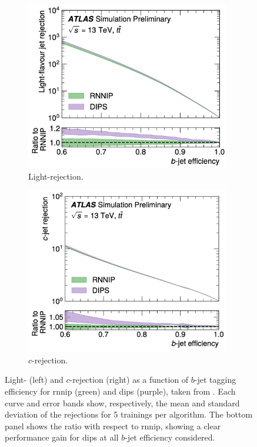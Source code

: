 \begin{figure}[h!]
  \centering
  \begin{subfigure}[b]{0.48\textwidth}
      \centering
      \includegraphics[width=0.98\textwidth]{Images/FTAG/dipsrnnipL.png}
      \caption{Light-rejection.} 
      \label{fig:dipsrnnipPerfL}
  \end{subfigure}
  \hfill
  \begin{subfigure}[b]{0.48\textwidth}
      \centering
      \includegraphics[width=0.98\textwidth]{Images/FTAG/dipsrnnipC.png}
      \caption{$c$-rejection.} 
      \label{fig:dipsrnnipPerfC}
  \end{subfigure}
  \caption{Light- (left) and $c$-rejection (right) as a function of $b$-jet tagging efficiency for \gls{rnnip} (green) and \gls{dips} (purple), taken from \cite{ATL-PHYS-PUB-2020-014}. Each curve and error bands show, respectively, the mean and standard deviation of the rejections for 5 trainings per algorithm. The bottom panel shows the ratio with respect to \gls{rnnip}, showing a clear performance gain for \gls{dips} at all $b$-jet efficiency considered.}
  \label{fig:dipsrnnipPerf}
\end{figure} 

